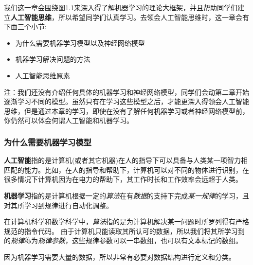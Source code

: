 \documentclass[12pt]{article}
\numberwithin{figure}{section}
\newenvironment{fullmodel}{
			\smallskip\noindent
			\begin{minipage}{\textwidth+\marginparwidth+\marginparsep}\smallskip\smallskip}
			{\smallskip\smallskip\end{minipage}\vspace{.1in}
			}
\numberwithin{equation}{section}
\begin{document}
\begin{fullmodel}
\begin{tcolorbox}[title=章节重点]
	我们这一章会围绕图1.1来深入得了解机器学习的理论大框架，并且帮助同学们建立\textbf{人工智能思维}，所以希望同学们认真学习。去领会人工智能思维时，这一章会有下面三个小节:
	\begin{itemize}
		\item 为什么需要机器学习模型以及神经网络模型
		\item 机器学习解决问题的方法
		\item 人工智能思维原素
	\end{itemize}
注：我们还没有介绍任何具体的机器学习和神经网络模型，同学们会动第二章开始逐渐学习不同的模型。虽然只有在学习这些模型之后，才能更深入得领会人工智能思维，但是通过本章的学习，即使在没有了解任何机器学习或者神经网络模型前，你仍然可以体会何谓人工智能和机器学习。
\end{tcolorbox}
\end{fullmodel}


\subsubsection{为什么需要机器学习模型}

\begin{definition}
	\textbf{人工智能}指的是计算机(或者其它机器)在人的指导下可以具备与人类某一项智力相匹配的能力。比如，在人的指导和帮助下，计算机可以对不同的物体进行识别，在很多情况下计算机因为在电力的帮助下，其工作时长和工作效率会远超于人类。
\end{definition}

\begin{definition}
	\textbf{机器学习}指的是计算机根据一定的\textit{算法}在有\textit{数据}的支持下完成\textit{某一规律}的学习，且对其所学习到规律进行自动化调整。
\end{definition}

\begin{remark}
在计算机科学和数学科学中，\textit{算法}指的是为计算机解决某一问题时所罗列得有严格规范的指令代码。	由于计算机只能读取其所认可的数据，所以我们将其所学习到的\textit{规律}称为\textit{规律参数}，这些规律参数可以一串数组，也可以有文本标记的数组。
\end{remark}

因为机器学习需要大量的数据，所以非常有必要对数据结构进行定义和分类。
\end{document}
